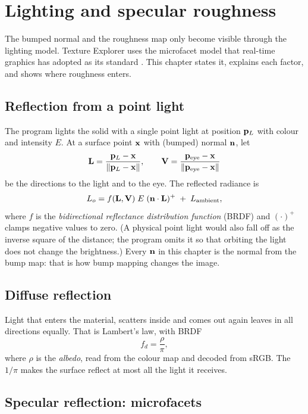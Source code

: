 \chapter{Lighting and specular roughness}
\label{ch:lighting}

The bumped normal and the roughness map only become visible through the lighting model. Texture
Explorer uses the microfacet model that real-time graphics has adopted as its standard
\cite{cook1982,walter2007,karis2013}. This chapter states it, explains each factor, and shows
where roughness enters.

\section{Reflection from a point light}
The program lights the solid with a single point light at position $\mathbf{p}_L$ with colour and
intensity $E$. At a surface point $\mathbf{x}$ with (bumped) normal $\mathbf{n}$, let
\[
  \mathbf{L} = \frac{\mathbf{p}_L-\mathbf{x}}{\lVert\mathbf{p}_L-\mathbf{x}\rVert},\qquad
  \mathbf{V} = \frac{\mathbf{p}_{\mathrm{eye}}-\mathbf{x}}{\lVert\mathbf{p}_{\mathrm{eye}}-\mathbf{x}\rVert}
\]
be the directions to the light and to the eye. The reflected radiance is
\[
  L_o = f(\mathbf{L},\mathbf{V})\;E\;(\mathbf{n}\cdot\mathbf{L})^+ \;+\; L_{\mathrm{ambient}},
\]
where $f$ is the \emph{bidirectional reflectance distribution function} (BRDF) and $(\cdot)^+$
clamps negative values to zero. (A physical point light would also fall off as the inverse
square of the distance; the program omits it so that orbiting the light does not change the
brightness.) Every $\mathbf{n}$ in this chapter is the normal from the bump map: that is how bump
mapping changes the image.

\section{Diffuse reflection}
Light that enters the material, scatters inside and comes out again leaves in all directions
equally. That is Lambert's law, with BRDF
\[
  f_d = \frac{\rho}{\pi},
\]
where $\rho$ is the \emph{albedo}, read from the colour map and decoded from sRGB. The
$1/\pi$ makes the surface reflect at most all the light it receives.

\section{Specular reflection: microfacets}

